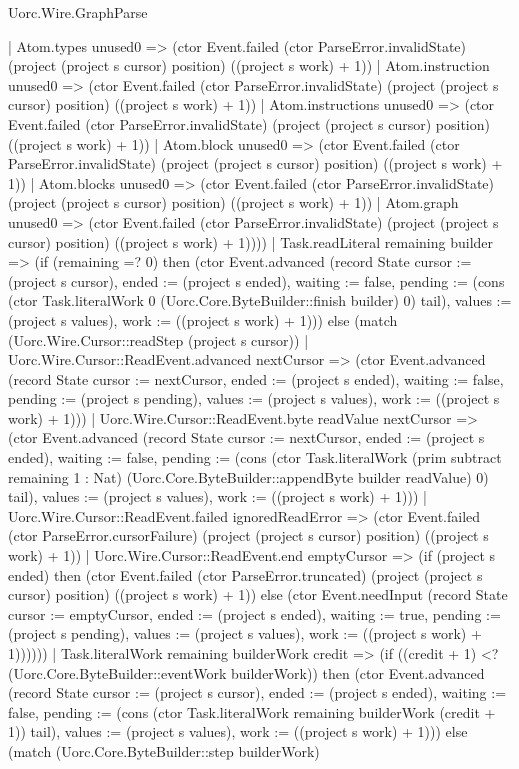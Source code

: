 \begin{lexlean}{Uorc.Wire.GraphParse}
\begin{semanticmodule}
{          | Atom.types unused0 => (ctor Event.failed (ctor ParseError.invalidState) (project (project s cursor) position) ((project s work) + 1))
          | Atom.instruction unused0 => (ctor Event.failed (ctor ParseError.invalidState) (project (project s cursor) position) ((project s work) + 1))
          | Atom.instructions unused0 => (ctor Event.failed (ctor ParseError.invalidState) (project (project s cursor) position) ((project s work) + 1))
          | Atom.block unused0 => (ctor Event.failed (ctor ParseError.invalidState) (project (project s cursor) position) ((project s work) + 1))
          | Atom.blocks unused0 => (ctor Event.failed (ctor ParseError.invalidState) (project (project s cursor) position) ((project s work) + 1))
          | Atom.graph unused0 => (ctor Event.failed (ctor ParseError.invalidState) (project (project s cursor) position) ((project s work) + 1))))
      | Task.readLiteral remaining builder => (if (remaining =? 0) then (ctor Event.advanced (record State {cursor := (project s cursor), ended := (project s ended), waiting := false, pending := (cons (ctor Task.literalWork 0 (Uorc.Core.ByteBuilder::finish builder) 0) tail), values := (project s values), work := ((project s work) + 1)})) else (match (Uorc.Wire.Cursor::readStep (project s cursor))
        | Uorc.Wire.Cursor::ReadEvent.advanced nextCursor => (ctor Event.advanced (record State {cursor := nextCursor, ended := (project s ended), waiting := false, pending := (project s pending), values := (project s values), work := ((project s work) + 1)}))
        | Uorc.Wire.Cursor::ReadEvent.byte readValue nextCursor => (ctor Event.advanced (record State {cursor := nextCursor, ended := (project s ended), waiting := false, pending := (cons (ctor Task.literalWork (prim subtract remaining 1 : Nat) (Uorc.Core.ByteBuilder::appendByte builder readValue) 0) tail), values := (project s values), work := ((project s work) + 1)}))
        | Uorc.Wire.Cursor::ReadEvent.failed ignoredReadError => (ctor Event.failed (ctor ParseError.cursorFailure) (project (project s cursor) position) ((project s work) + 1))
        | Uorc.Wire.Cursor::ReadEvent.end emptyCursor => (if (project s ended) then (ctor Event.failed (ctor ParseError.truncated) (project (project s cursor) position) ((project s work) + 1)) else (ctor Event.needInput (record State {cursor := emptyCursor, ended := (project s ended), waiting := true, pending := (project s pending), values := (project s values), work := ((project s work) + 1)})))))
      | Task.literalWork remaining builderWork credit => (if ((credit + 1) <? (Uorc.Core.ByteBuilder::eventWork builderWork)) then (ctor Event.advanced (record State {cursor := (project s cursor), ended := (project s ended), waiting := false, pending := (cons (ctor Task.literalWork remaining builderWork (credit + 1)) tail), values := (project s values), work := ((project s work) + 1)})) else (match (Uorc.Core.ByteBuilder::step builderWork)
}
\end{semanticmodule}
\end{lexlean}
